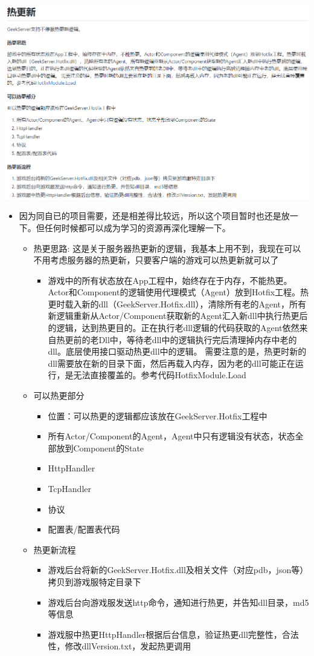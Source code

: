 \documentclass[9pt, b5paper]{article}
\begin{document}
\includegraphics[width=.9\linewidth]{./pic/readme_20230102_205637.png}
\begin{itemize}
\item 因为同自已的项目需要，还是相差得比较远，所以这个项目暂时也还是放一下。但任何时候都可以成为学习的资源再深化理解一下。　
\begin{itemize}
\item 热更思路: 这是关于服务器热更新的逻辑，我基本上用不到，我现在可以不用考虑服务器的热更新，只要客户端的游戏可以热更新就可以了
\begin{itemize}
\item 游戏中的所有状态放在App工程中，始终存在于内存，不能热更。Actor和Component的逻辑使用代理模式（Agent）放到Hotfix工程。热更时载入新的dll（GeekServer.Hotfix.dll），清除所有老的Agent，所有新逻辑重新从Actor/Component获取新的Agent汇入新dll中执行热更后的逻辑，达到热更目的。正在执行老dll逻辑的代码获取的Agent依然来自热更前的老Dll中，等待老dll中的逻辑执行完后清理掉内存中老的dll。底层使用接口驱动热更dll中的逻辑。 需要注意的是，热更时新的dll需要放在新的目录下面，然后再载入内存，因为老的dll可能正在运行，是无法直接覆盖的。参考代码HotfixModule.Load
\end{itemize}
\item 可以热更部分
\begin{itemize}
\item 位置：可以热更的逻辑都应该放在GeekServer.Hotfix工程中
\item 所有Actor/Component的Agent，Agent中只有逻辑没有状态，状态全部放到Component的State
\item HttpHandler
\item TcpHandler
\item 协议
\item 配置表/配置表代码
\end{itemize}

\item 热更新流程
\begin{itemize}
\item 游戏后台将新的GeekServer.Hotfix.dll及相关文件（对应pdb，json等）拷贝到游戏服特定目录下
\item 游戏后台向游戏服发送http命令，通知进行热更，并告知dll目录，md5等信息
\item 游戏服中热更HttpHandler根据后台信息，验证热更dll完整性，合法性，修改dllVersion.txt，发起热更调用
\end{itemize}
\end{itemize}
\end{itemize}
\end{document}
